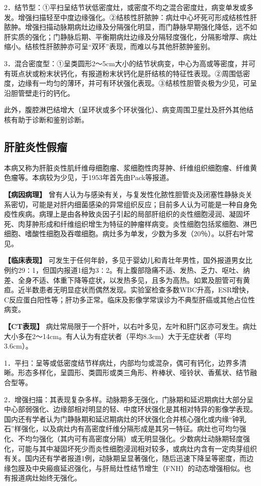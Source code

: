 2．结节型：①平扫呈结节状低密度灶，或密度不均之混合密度灶，病变单发或多发。增强扫描轻至中度边缘强化。②结核性肝脓肿：病灶中心坏死可形成结核性肝脓肿。增强扫描动脉期病灶边缘及分隔强化明显，而门静脉早期强化降低，远不如肝实质的强化；门静脉后期、平衡期病灶边缘及分隔轻度强化，分隔影增厚、病灶缩小。结核性肝脓肿亦可呈“双环”表现，而难以与其他肝脓肿鉴别。

3．混合密度型：①呈类圆形2～5cm大小的结节状病变，中心为高或等密度，并可有斑点状或粉末状钙化，有报道粉末状钙化是肝结核的特征性表现。②周围低密度，边缘有一均匀的薄环，并可有环状强化表现。③结核性胆管炎极为少见，可呈沿胆管壁走行的钙化。

此外，腹腔淋巴结增大（呈环状或多个环状强化）、病变周围卫星灶及肝外其他结核有助于诊断和鉴别诊断。

\subsection{肝脏炎性假瘤}

本病又称为肝脏炎性肌纤维母细胞瘤、浆细胞性肉芽肿、纤维组织细胞瘤、纤维黄色瘤等。本病较为少见，于1953年首先由Pack等报道。

\textbf{【病因病理】}
曾有人认为与感染有关，与复发性化脓性胆管炎及闭塞性静脉炎关系密切，可能是对肝内细菌感染的异常组织反应；目前多人认为可能是一种自身免疫性疾病。病理上是由各种致炎因子引起的局部肝组织的炎性细胞浸润、凝固坏死、肉芽肿形成和纤维组织增生为特征的肿瘤样病变。炎性细胞包括浆细胞、淋巴细胞、嗜酸性细胞及吞噬细胞。病灶多为单发，少数为多发（20％）。以肝右叶常见。

\textbf{【临床表现】}
可发生于任何年龄，多见于婴幼儿和青壮年男性，国外报道男女比例约29∶1，但国内报道1组为3∶2。有上腹部隐痛不适、发热、乏力、呕吐、纳差、全身不适、体重下降等症状，以发热多见，且多为高热。如累及胆管可有黄疸。近半数患者无明显症状而偶然发现。实验室检查多数WBC升高，ESR增快，C反应蛋白阳性等；肝功多正常。临床及影像学常误诊为不典型肝癌或其他占位性病变。

\textbf{【CT表现】}
病灶常局限于一个肝叶，以右叶多见，左叶和肝门区亦可发生。病灶大小多在2～14cm。有人认为有症状者（平均8.3cm）大于无症状者（平均3.6cm）。

1．平扫：呈等或低密度结节样病灶，内部均匀或混杂，偶可有钙化，边界多清晰。形态多样化，呈圆形、类圆形或类三角形、杵棒状、哑铃状、香蕉状、结节融合型等。

2．增强扫描：其表现复杂多样。动脉期多无强化，门脉期和延迟期病灶大部分呈中心部弱强化、边缘部相对明显的轻、中度环状强化是其相对特异的影像学表现。国内还有学者认为门静脉期和延迟期病灶的环状强化合并核心强化或内缘“钟乳石”样强化，以及病灶内有高密度纤维分隔形成是其另一特征。病灶也可均匀强化、不均匀强化（其内可有高密度分隔）或无明显强化。少数病灶动脉期轻度强化，可能与其中凝固坏死少而炎性细胞浸润相对较多，或病灶内含有一定肉芽组织有关。国内还有学者报道1例，动脉期呈显著强化，随后迅速下降呈等密度，而边缘包膜及中央瘢痕延迟强化，与肝局灶性结节增生（FNH）的动态增强相似。也有报道病灶始终无强化。

